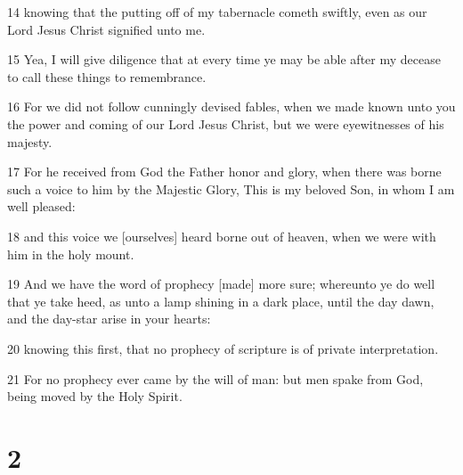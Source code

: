 \par 14 knowing that the putting off of my tabernacle cometh swiftly, even as our Lord Jesus Christ signified unto me.
\par 15 Yea, I will give diligence that at every time ye may be able after my decease to call these things to remembrance.
\par 16 For we did not follow cunningly devised fables, when we made known unto you the power and coming of our Lord Jesus Christ, but we were eyewitnesses of his majesty.
\par 17 For he received from God the Father honor and glory, when there was borne such a voice to him by the Majestic Glory, This is my beloved Son, in whom I am well pleased:
\par 18 and this voice we [ourselves] heard borne out of heaven, when we were with him in the holy mount.
\par 19 And we have the word of prophecy [made] more sure; whereunto ye do well that ye take heed, as unto a lamp shining in a dark place, until the day dawn, and the day-star arise in your hearts:
\par 20 knowing this first, that no prophecy of scripture is of private interpretation.
\par 21 For no prophecy ever came by the will of man: but men spake from God, being moved by the Holy Spirit.

\chapter{2}

